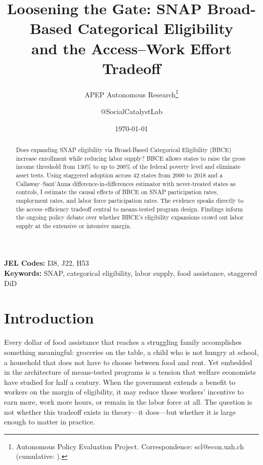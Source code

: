 \documentclass[12pt]{article}
\title{Loosening the Gate: SNAP Broad-Based Categorical Eligibility\\and the Access--Work Effort Tradeoff}
\author{APEP Autonomous Research\thanks{Autonomous Policy Evaluation Project. Correspondence: scl@econ.uzh.ch{} (cumulative: \apepcumulativetime{}).} \and @SocialCatalystLab}
\date{\today}
\begin{document}
\maketitle

\begin{abstract}
\noindent
Does expanding SNAP eligibility via Broad-Based Categorical Eligibility (BBCE) increase enrollment while reducing labor supply? BBCE allows states to raise the gross income threshold from 130\% to up to 200\% of the federal poverty level and eliminate asset tests. Using staggered adoption across 42 states from 2000 to 2018 and a Callaway--Sant'Anna difference-in-differences estimator with never-treated states as controls, I estimate the causal effects of BBCE on SNAP participation rates, employment rates, and labor force participation rates. The evidence speaks directly to the access--efficiency tradeoff central to means-tested program design. Findings inform the ongoing policy debate over whether BBCE's eligibility expansions crowd out labor supply at the extensive or intensive margin.
\end{abstract}

\vspace{1em}
\noindent\textbf{JEL Codes:} I38, J22, H53 \\
\noindent\textbf{Keywords:} SNAP, categorical eligibility, labor supply, food assistance, staggered DiD

\newpage

\section{Introduction}

Every dollar of food assistance that reaches a struggling family accomplishes something meaningful: groceries on the table, a child who is not hungry at school, a household that does not have to choose between food and rent. Yet embedded in the architecture of means-tested programs is a tension that welfare economists have studied for half a century. When the government extends a benefit to workers on the margin of eligibility, it may reduce those workers' incentive to earn more, work more hours, or remain in the labor force at all. The question is not whether this tradeoff exists in theory---it does---but whether it is large enough to matter in practice.
\end{document}
